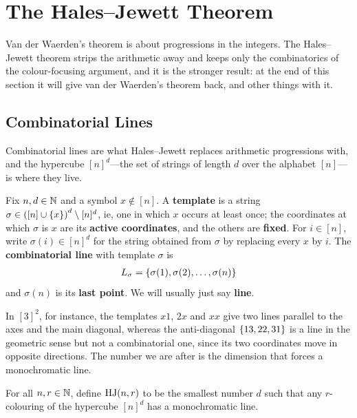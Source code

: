 \section{The Hales--Jewett Theorem}

Van der Waerden's theorem is about progressions in the integers. The Hales--Jewett theorem strips the arithmetic away and keeps only the combinatorics of the colour-focusing argument, and it is the stronger result: at the end of this section it will give van der Waerden's theorem back, and other things with it.

\subsection{Combinatorial Lines}

Combinatorial lines are what Hales--Jewett replaces arithmetic progressions with, and the hypercube $[n]^d$---the set of strings of length $d$ over the alphabet $[n]$---is where they live.

\begin{boxdefinition}
    Fix $n, d \in \mathbb{N}$ and a symbol $x \notin [n]$. A \textbf{template} is a string $\sigma \in \left( [n] \cup \left\{ x \right\} \right)^d \setminus [n]^d$, ie, one in which $x$ occurs at least once; the coordinates at which $\sigma$ is $x$ are its \textbf{active coordinates}, and the others are \textbf{fixed}. For $i \in [n]$, write $\sigma(i) \in [n]^d$ for the string obtained from $\sigma$ by replacing every $x$ by $i$. The \textbf{combinatorial line} with template $\sigma$ is
    \begin{align*}
        L_\sigma = \left\{ \sigma(1), \sigma(2), \ldots, \sigma(n) \right\}
    \end{align*}
    and $\sigma(n)$ is its \textbf{last point}. We will usually just say \textbf{line}.
\end{boxdefinition}

In $[3]^2$, for instance, the templates $x1$, $2x$ and $xx$ give two lines parallel to the axes and the main diagonal, whereas the anti-diagonal $\left\{ 13, 22, 31 \right\}$ is a line in the geometric sense but not a combinatorial one, since its two coordinates move in opposite directions. The number we are after is the dimension that forces a monochromatic line.

\begin{boxdefinition}
    For all $n, r \in \mathbb{N}$, define $\operatorname{HJ}(n, r)$ to be the smallest number $d$ such that any $r$-colouring of the hypercube $[n]^d$ has a monochromatic line.
\end{boxdefinition}


